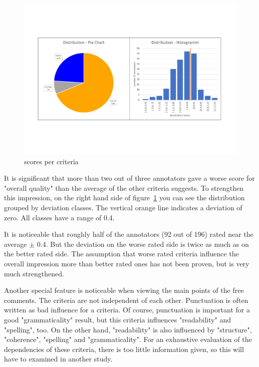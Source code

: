 \begin{figure}[H]
	\centering
	\includegraphics[trim=10 150 10 150, width=\textwidth]{img/deviation.pdf}
	\caption{scores per criteria}
	\label{fig:deviation}
\end{figure}

It is significant that more than two out of three annotators gave a worse score for "overall quality" than the average of the other criteria suggests.
To strengthen this impression, on the right hand side of figure~\ref{fig:deviation} you can see the distribution grouped by deviation classes. The vertical orange line indicates a deviation of zero. All classes have a range of 0.4.

It is noticeable that roughly half of the annotators (92 out of 196) rated near the average $\pm$ 0.4. But the deviation on the worse rated side is twice as much as on the better rated side.
The assumption that worse rated criteria influence the overall impression more than better rated ones has not been proven, but is very much strengthened.

Another special feature is noticeable when viewing the main points of the free comments.
The criteria are not independent of each other.
Punctuation is often written as bad influence for a criteria. Of course, punctuation is important for a good "grammaticality" result, but this criteria influences "readability" and "spelling", too.
On the other hand, "readability" is also influenced by "structure", "coherence", "spelling" and "grammaticality".
For an exhaustive evaluation of the dependencies of these criteria, there is too little information given, so this will have to examined in another study.


